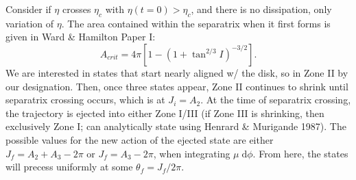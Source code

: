 \documentclass[11pt,
        usenames, %
        dvipsnames %
    ]{article}
\newcommand*{\p}[1]{\left(#1\right)}
\newcommand*{\s}[1]{\left[#1\right]}
\begin{document}
Consider if $\eta$ crosses $\eta_c$ with $\eta(t = 0) > \eta_c$, and there is no
dissipation, only variation of $\eta$. The area contained within the separatrix
when it first forms is given in Ward \& Hamilton Paper I\@:
\begin{equation}
    A_{crit} = 4\pi \s{1 - \p{1 + \tan^{2/3}I}^{-3/2}}.
\end{equation}
We are interested in states that start nearly aligned w/ the disk, so in Zone II
by our designation. Then, once three states appear, Zone II continues to shrink
until separatrix crossing occurs, which is at $J_i = A_2$. At the time of
separatrix crossing, the trajectory is ejected into either Zone I/III (if Zone
III is shrinking, then exclusively Zone I\@; can analytically state using
Henrard \& Murigande 1987). The possible values for the new action of the
ejected state are either $J_f = A_2 + A_3 - 2\pi$ or $J_f = A_3 - 2\pi$, when
integrating $\mu\;\mathrm{d}\phi$. From here, the states will precess uniformly
at some $\theta_f = J_f / 2\pi$.
\end{document}
